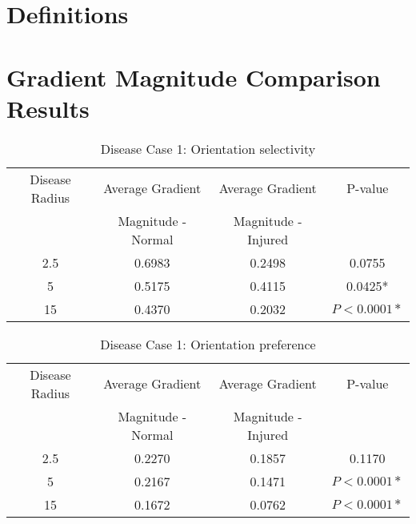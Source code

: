 %



\appendix
\begin{small}

\section{Definitions}  


\section{Gradient Magnitude Comparison Results}


\begin{table}[htbp]
\begin{center}
\begin{tabular}{|c|c|c|c|}
\hline
Disease Radius & Average Gradient & Average Gradient &  P-value\\ 
	& Magnitude - Normal & Magnitude - Injured & \\ \hline

2.5 & 0.6983 & 0.2498 & 0.0755 \\ \hline
5   & 0.5175 & 0.4115 & 0.0425* \\ \hline
15  & 0.4370 & 0.2032 & $P < 0.0001*$\\ \hline
\end{tabular}
\end{center}
\caption{Disease Case 1: Orientation selectivity}
\label{fig:gradMagCenterQ}
\end{table}

\begin{table}[htbp]
\begin{center}
\begin{tabular}{|c|c|c|c|}
\hline
Disease Radius & Average Gradient & Average Gradient &  P-value\\ 
	& Magnitude - Normal & Magnitude - Injured & \\ \hline
2.5 & 0.2270 & 0.1857 & 0.1170 \\ \hline
5   & 0.2167 & 0.1471 & $P < 0.0001*$ \\ \hline
15  & 0.1672 & 0.0762 & $P < 0.0001*$ \\ \hline
\end{tabular}
\end{center}
\caption{Disease Case 1: Orientation preference}
\label{fig:gradMagCenterPhi}
\end{table}


\end{small}
